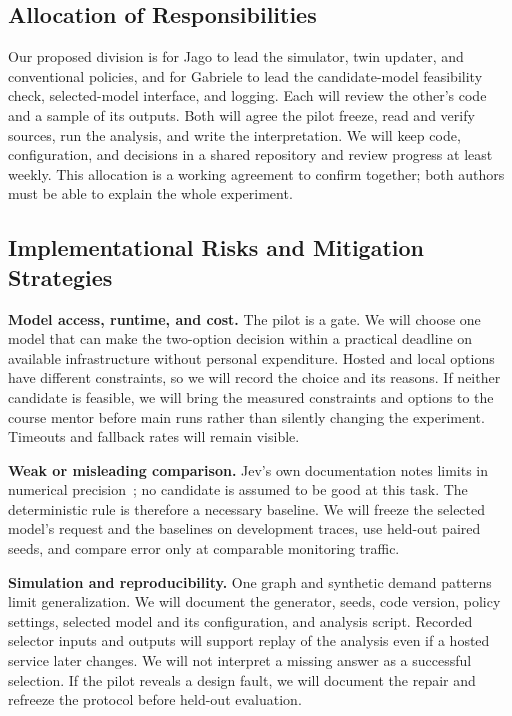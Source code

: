 \documentclass[11pt,a4paper]{article}
\begin{document}
\subsection{Allocation of Responsibilities}
Our proposed division is for Jago to lead the simulator, twin updater, and conventional policies, and for Gabriele to lead the candidate-model feasibility check, selected-model interface, and logging. Each will review the other's code and a sample of its outputs. Both will agree the pilot freeze, read and verify sources, run the analysis, and write the interpretation. We will keep code, configuration, and decisions in a shared repository and review progress at least weekly. This allocation is a working agreement to confirm together; both authors must be able to explain the whole experiment.

\subsection{Implementational Risks and Mitigation Strategies}
\textbf{Model access, runtime, and cost.} The pilot is a gate. We will choose one model that can make the two-option decision within a practical deadline on available infrastructure without personal expenditure. Hosted and local options have different constraints, so we will record the choice and its reasons. If neither candidate is feasible, we will bring the measured constraints and options to the course mentor before main runs rather than silently changing the experiment. Timeouts and fallback rates will remain visible.

\textbf{Weak or misleading comparison.} Jev's own documentation notes limits in numerical precision~\cite{limits}; no candidate is assumed to be good at this task. The deterministic rule is therefore a necessary baseline. We will freeze the selected model's request and the baselines on development traces, use held-out paired seeds, and compare error only at comparable monitoring traffic.

\textbf{Simulation and reproducibility.} One graph and synthetic demand patterns limit generalization. We will document the generator, seeds, code version, policy settings, selected model and its configuration, and analysis script. Recorded selector inputs and outputs will support replay of the analysis even if a hosted service later changes. We will not interpret a missing answer as a successful selection. If the pilot reveals a design fault, we will document the repair and refreeze the protocol before held-out evaluation.
\end{document}

